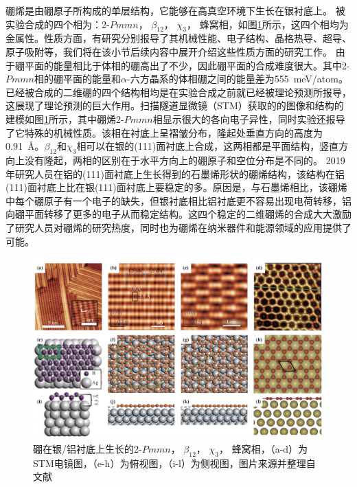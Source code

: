 硼烯是由硼原子所构成的单层结构，它能够在高真空环境下生长在银衬底上\cite{zhang2015two}。
被实验合成的四个相为：2-$Pmmn$， $\beta_{12}$， $\chi_3$， 蜂窝相，如图\ref{fig:boron4phase}所示，这四个相均为金属性。性质方面，有研究分别报导了其机械性能、电子结构、晶格热导、超导、原子吸附等\cite{penev2016can, xu2016nucleation, lopez2016electronic, peng2016electronic, carrete2016physically, wang2016strain, xiao2016enhanced, gao2017prediction, liu2016stable, yang2008ab, zabolotskiy2016strain, yuan2015effect, liu2013boron, zhang2016borophene, shu2016unveiling}，我们将在该小节后续内容中展开介绍这些性质方面的研究工作。
由于硼平面的能量相比于体相的硼高出了不少，因此硼平面的合成难度很大。其中2-$Pmmn$相的硼平面的能量和$\alpha$-六方晶系的体相硼之间的能量差为\SI{555}{\meV/atom}\cite{lherbier2016electronic}。已经被合成的二维硼的四个结构相均是在实验合成之前就已经被理论预测所报导，这展现了理论预测的巨大作用。扫描隧道显微镜（STM）获取的的图像和结构的建模如图\ref{fig:boron4phase}所示，其中硼烯2-$Pmmn$相显示很大的各向电子异性，同时实验还报导了它特殊的机械性质。该相在衬底上呈褶皱分布，隆起处垂直方向的高度为\SI{0.91}{\angstrom}。$\beta_{12}$和$\chi_3$相可以在银的(111)面衬底上合成，这两相都是平面结构，竖直方向上没有隆起，两相的区别在于水平方向上的硼原子和空位分布是不同的。
2019年研究人员在铝的(111)面衬底上生长得到的石墨烯形状的硼烯结构\cite{li2018experimental}，该结构在铝(111)面衬底上比在银(111)面衬底上要稳定的多。原因是，与石墨烯相比，该硼烯中每个硼原子有一个电子的缺失，但银衬底相比铝衬底更不容易出现电荷转移，铝向硼平面转移了更多的电子从而稳定结构。这四个稳定的二维硼烯的合成大大激励了研究人员对硼烯的研究热度，同时也为硼烯在纳米器件和能源领域的应用提供了可能。

\begin{figure}[bt]
  \includegraphics[width=1.0\textwidth]{figs/ch1_boron4phase.png}
  \centering
  \caption{硼在银/铝衬底上生长的2-$Pmmn$， $\beta_{12}$， $\chi_3$， 蜂窝相，（a-d）为STM电镜图，（e-h）为俯视图，（i-l）为侧视图，图片来源并整理自文献\cite{mannix2015synthesis,li2018experimental,feng2016experimental}}
  \label{fig:boron4phase}
\end{figure}

